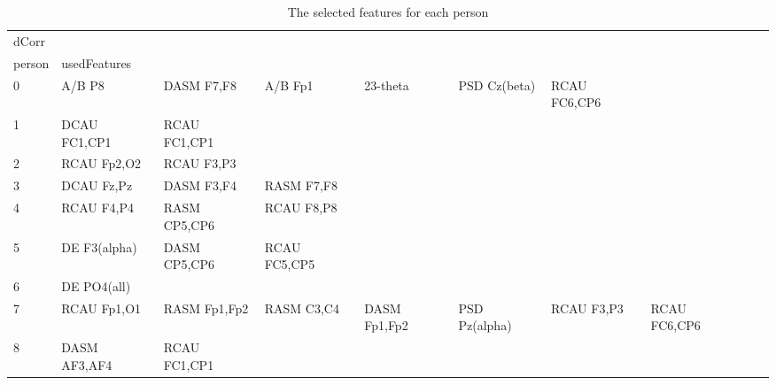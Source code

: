 \begin{landscape}
\begin{table}[]
\centering
\caption{The selected features for each person}
\begin{tabular}{l|llllllll}
dCorr    &                &                &                &                &                &                &               &                &               &               \\
person   & usedFeatures   &                &                &                &                &                &               &                &               &               \\
0        & A/B P8         & DASM F7,F8     & A/B Fp1        & 23-theta       & PSD Cz(beta)   & RCAU FC6,CP6   &               &                &               &               \\
1        & DCAU FC1,CP1   & RCAU FC1,CP1   &                &                &                &                &               &                &               &               \\
2        & RCAU Fp2,O2    & RCAU F3,P3     &                &                &                &                &               &                &               &               \\
3        & DCAU Fz,Pz     & DASM F3,F4     & RASM F7,F8     &                &                &                &               &                &               &               \\
4        & RCAU F4,P4     & RASM CP5,CP6   & RCAU F8,P8     &                &                &                &               &                &               &               \\
5        & DE F3(alpha)   & DASM CP5,CP6   & RCAU FC5,CP5   &                &                &                &               &                &               &               \\
6        & DE PO4(all)    &                &                &                &                &                &               &                &               &               \\
7        & RCAU Fp1,O1    & RASM Fp1,Fp2   & RASM C3,C4     & DASM Fp1,Fp2   & PSD Pz(alpha)  & RCAU F3,P3     & RCAU FC6,CP6  &                &               &               \\
8        & DASM AF3,AF4   & RCAU FC1,CP1   &                &                &                &                &               &                &               &               \\

\end{tabular}
\end{table}
\end{landscape}
